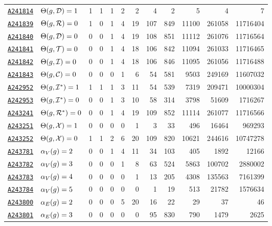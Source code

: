 \documentclass[12pt]{article}
\newcommand{\OEIS}[1]
{\href{https://oeis.org/#1}{\texttt{#1}}}
\begin{document}
\begin{appendices}
\begin{longtable}{ l l r r r r r r r r r r}
\OEIS{A241814} & $\Theta(g,\mathcal{D}) =1$ & 1 & 1 & 1 & 2 & 2 & 4 & 2 & 5 & 4 & 7 \\
\OEIS{A241839} & $\Theta(g,\mathcal{R}) =0$ & 1 & 0 & 1 & 4 & 19 & 107 & 849 & 11100 & 261058 & 11716404 \\
\OEIS{A241840} & $\Theta(g,\mathcal{D}) =0$ & 0 & 0 & 1 & 4 & 19 & 108 & 851 & 11112 & 261076 & 11716564 \\
\OEIS{A241841} & $\Theta(g,\mathcal{T}) =0$ & 0 & 0 & 1 & 4 & 18 & 106 & 842 & 11094 & 261033 & 11716465 \\
\OEIS{A241842} & $\Theta(g,\mathcal{I}) =0$ & 0 & 0 & 1 & 4 & 18 & 106 & 846 & 11095 & 261056 & 11716488 \\
\OEIS{A241843} & $\Theta(g,\mathcal{C}) =0$ & 0 & 0 & 0 & 1 & 6 & 54 & 581 & 9503 & 249169 & 11607032 \\
\OEIS{A242952} & $\Theta(g,\mathcal{I}^*) =1$ & 1 & 1 & 1 & 3 & 11 & 54 & 539 & 7319 & 209471 & 10000304 \\
\OEIS{A242953} & $\Theta(g,\mathcal{I}^*) =0$ & 0 & 0 & 1 & 3 & 10 & 58 & 314 & 3798 & 51609 & 1716267 \\
\OEIS{A243241} & $\Theta(g,\mathcal{R}^*) =0$ & 0 & 0 & 1 & 4 & 19 & 109 & 852 & 11114 & 261077 & 11716566 \\

\OEIS{A243251} & $\Theta(g,\mathcal{X}) =1$ & 0 & 0 & 0 & 0 & 1 & 3 & 33 & 496 & 16464 & 969293 \\
\OEIS{A243252} & $\Theta(g,\mathcal{X}) =0$ & 1 & 1 & 2 & 6 & 20 & 109 & 820 & 10621 & 244616 & 10747278 \\

\OEIS{A243781} & $\alpha_V(g) =2$ & 0 & 0 & 1 & 4 & 11 & 34 & 103 & 405 & 1892 & 12166 \\
\OEIS{A243782} & $\alpha_V(g) =3$ & 0 & 0 & 0 & 1 & 8 & 63 & 524 & 5863 & 100702 & 2880002 \\
\OEIS{A243783} & $\alpha_V(g) =4$ & 0 & 0 & 0 & 0 & 1 & 13 & 205 & 4308 & 135563 & 7161399 \\
\OEIS{A243784} & $\alpha_V(g) =5$ & 0 & 0 & 0 & 0 & 0 & 1 & 19 & 513 & 21782 & 1576634 \\
\OEIS{A243800} & $\alpha_E(g) =2$ & 0 & 0 & 0 & 5 & 20 & 16 & 22 & 29 & 37 & 46 \\
\OEIS{A243801} & $\alpha_E(g) =3$ & 0 & 0 & 0 & 0 & 0 & 95 & 830 & 790 & 1479 & 2625 \\
\end{longtable}


\end{appendices}
\end{document}
